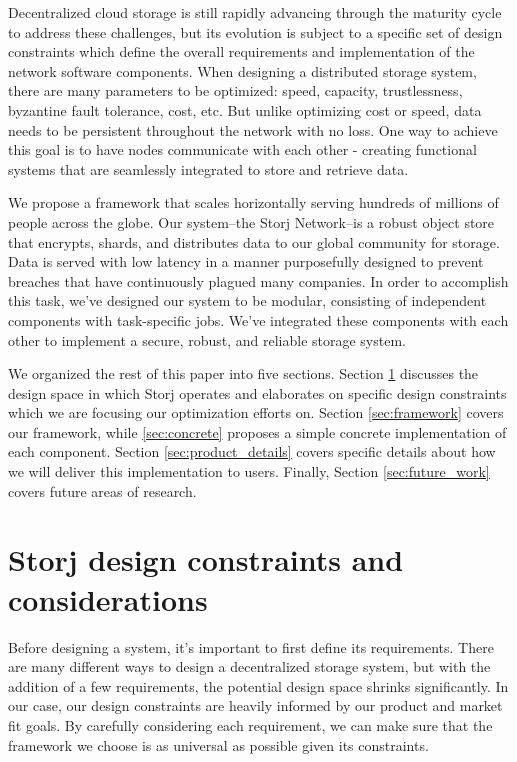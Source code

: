 \documentclass[a4paper,10pt]{article} \usepackage[utf8]{inputenc}
\begin{document}
Decentralized cloud storage is still rapidly advancing through the maturity
cycle to address these challenges, but its evolution
is subject to a specific set of design constraints which
define the overall requirements and implementation of
the network software components. When designing a distributed storage system,
there are many parameters to be optimized: speed, capacity, trustlessness,
byzantine fault tolerance, cost, etc.
But unlike optimizing cost or speed, data needs to be persistent throughout
the network with no loss.
One way to achieve this goal is to have nodes communicate with each other -
creating functional systems that are seamlessly integrated to store
and retrieve data.

We propose a framework that scales horizontally serving hundreds of millions of
people across the globe. Our system--the Storj Network--is a robust object store
that encrypts, shards, and distributes data to our global community for storage.
Data is served with low latency in a manner purposefully designed to prevent
breaches that have continuously plagued many companies.
In order to accomplish this task, we've designed our system to be modular,
consisting of independent components with task-specific jobs.
We've integrated these components with each other to implement a secure,
robust, and reliable storage system.

We organized the rest of this paper into five
sections. Section \ref{sec:design_constraints} discusses the design space
in which Storj operates and elaborates on specific design constraints which
we are focusing our optimization efforts on.
Section \ref{sec:framework} covers our framework, while \ref{sec:concrete}
proposes a simple concrete implementation of each component.
Section \ref{sec:product_details} covers specific details
about how we will deliver this implementation to users. Finally, Section
\ref{sec:future_work} covers future areas of research.

\section{Storj design constraints and
considerations}\label{sec:design_constraints}

Before designing a system, it's important to first define its requirements.
There are many different ways to design a decentralized storage system, but
with the addition of a few requirements, the potential design space shrinks
significantly.
In our case, our design constraints are heavily informed by our product and
market fit goals.
By carefully considering each requirement, we can make sure that the framework
we choose is as universal as possible given its constraints.
\end{document}
